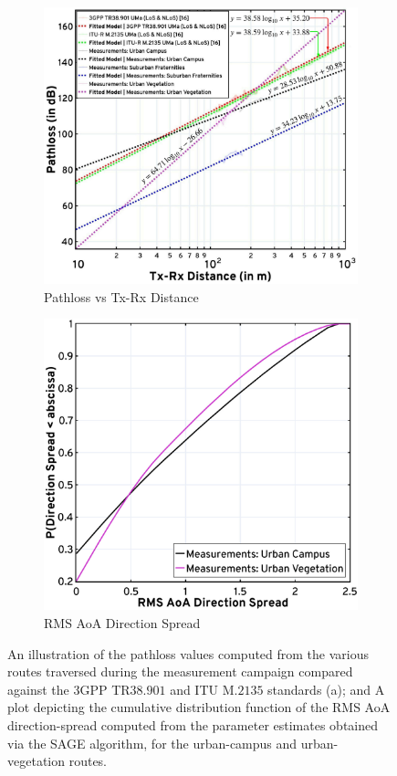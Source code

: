 \documentclass[10pt, twocolumn]{IEEEtran}
\begin{document}
\begin{figure} [t]
     \centering
     \begin{subfigure}{0.496\linewidth}
         \centering
         \includegraphics[width=0.82\linewidth]{figs/pl_distance_annotated.jpg}
         \caption{Pathloss vs Tx-Rx Distance}
         \label{F6a}
     \end{subfigure}
     \begin{subfigure}{0.496\linewidth}
         \centering
         \includegraphics[width=0.785\linewidth]{figs/rms_direction_spread.jpg}
         \caption{RMS AoA Direction Spread}
         \label{F6b}
     \end{subfigure}
     \vspace{-5mm}
     \caption{An illustration of the pathloss values computed from the various routes traversed during the measurement campaign compared against the $3$GPP TR$38.901$ and ITU M.$2135$ standards (a); and A plot depicting the cumulative distribution function of the RMS AoA direction-spread computed from the parameter estimates obtained via the SAGE algorithm, for the urban-campus and urban-vegetation routes.}
     \label{F6}
     \vspace{-4mm}
\end{figure}
\end{document}
